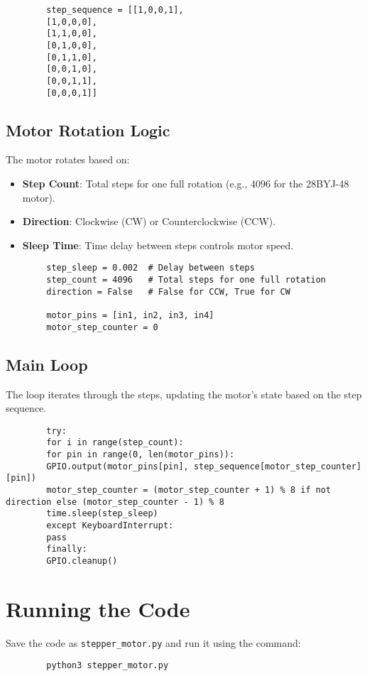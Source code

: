 \documentclass{article}
\begin{document}
	\begin{lstlisting}
		step_sequence = [[1,0,0,1],
		[1,0,0,0],
		[1,1,0,0],
		[0,1,0,0],
		[0,1,1,0],
		[0,0,1,0],
		[0,0,1,1],
		[0,0,0,1]]
	\end{lstlisting}
	
	\subsection*{Motor Rotation Logic}
	The motor rotates based on:
	\begin{itemize}
		\item \textbf{Step Count}: Total steps for one full rotation (e.g., 4096 for the 28BYJ-48 motor).
		\item \textbf{Direction}: Clockwise (CW) or Counterclockwise (CCW).
		\item \textbf{Sleep Time}: Time delay between steps controls motor speed.
	\end{itemize}
	
	\begin{lstlisting}
		step_sleep = 0.002  # Delay between steps
		step_count = 4096   # Total steps for one full rotation
		direction = False   # False for CCW, True for CW
		
		motor_pins = [in1, in2, in3, in4]
		motor_step_counter = 0
	\end{lstlisting}
	
	\subsection*{Main Loop}
	The loop iterates through the steps, updating the motor's state based on the step sequence.
	
	\begin{lstlisting}
		try:
		for i in range(step_count):
		for pin in range(0, len(motor_pins)):
		GPIO.output(motor_pins[pin], step_sequence[motor_step_counter][pin])
		motor_step_counter = (motor_step_counter + 1) % 8 if not direction else (motor_step_counter - 1) % 8
		time.sleep(step_sleep)
		except KeyboardInterrupt:
		pass
		finally:
		GPIO.cleanup()
	\end{lstlisting}
	
	\section*{Running the Code}
	Save the code as \texttt{stepper\_motor.py} and run it using the command:
	\begin{lstlisting}
		python3 stepper_motor.py
	\end{lstlisting}
	
\end{document}
